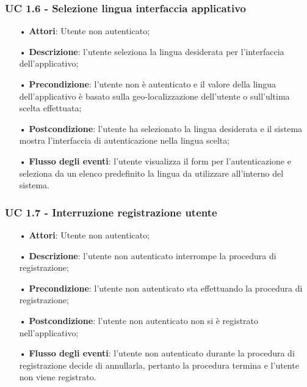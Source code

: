 \subsubsection{UC 1.6 - Selezione lingua interfaccia applicativo}
\begin{itemize}
\item[•]\textbf{Attori}: Utente non autenticato;
\item[•]\textbf{Descrizione}: l’utente seleziona la lingua desiderata per l'interfaccia dell'applicativo;
\item[•]\textbf{Precondizione}: l’utente non è autenticato e il valore della lingua dell'applicativo è basato sulla geo-localizzazione dell'utente o sull'ultima scelta effettuata;
\item[•]\textbf{Postcondizione}: l’utente ha selezionato la lingua desiderata e il sistema mostra l'interfaccia di autenticazione nella lingua scelta;
\item[•]\textbf{Flusso degli eventi}: l'utente visualizza il form per l'autenticazione e seleziona da un elenco predefinito la lingua da utilizzare all'interno del sistema.
\end{itemize}

\subsubsection{UC 1.7 - Interruzione registrazione utente}
\begin{itemize}
	\item[•] \textbf{Attori}: Utente non autenticato;
	\item[•] \textbf{Descrizione}: l’utente non autenticato interrompe la procedura di registrazione;
	\item[•] \textbf{Precondizione}: l'utente non autenticato sta effettuando la procedura di registrazione;
	\item[•] \textbf{Postcondizione}: l'utente non autenticato non si è registrato nell'applicativo;
	\item[•] \textbf{Flusso degli eventi}: l'utente non autenticato durante la procedura di registrazione decide di annullarla, pertanto la procedura termina e l'utente non viene registrato.
\end{itemize}

